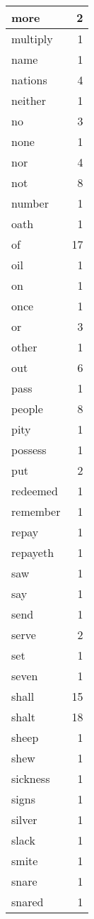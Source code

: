 \begin{center}
\begin{longtable}{l|r}
more & 2 \\ \hline
multiply & 1 \\ \hline
name & 1 \\ \hline
nations & 4 \\ \hline
neither & 1 \\ \hline
no & 3 \\ \hline
none & 1 \\ \hline
nor & 4 \\ \hline
not & 8 \\ \hline
number & 1 \\ \hline
oath & 1 \\ \hline
of & 17 \\ \hline
oil & 1 \\ \hline
on & 1 \\ \hline
once & 1 \\ \hline
or & 3 \\ \hline
other & 1 \\ \hline
out & 6 \\ \hline
pass & 1 \\ \hline
people & 8 \\ \hline
pity & 1 \\ \hline
possess & 1 \\ \hline
put & 2 \\ \hline
redeemed & 1 \\ \hline
remember & 1 \\ \hline
repay & 1 \\ \hline
repayeth & 1 \\ \hline
saw & 1 \\ \hline
say & 1 \\ \hline
send & 1 \\ \hline
serve & 2 \\ \hline
set & 1 \\ \hline
seven & 1 \\ \hline
shall & 15 \\ \hline
shalt & 18 \\ \hline
sheep & 1 \\ \hline
shew & 1 \\ \hline
sickness & 1 \\ \hline
signs & 1 \\ \hline
silver & 1 \\ \hline
slack & 1 \\ \hline
smite & 1 \\ \hline
snare & 1 \\ \hline
snared & 1 \\ \hline

\end{longtable}
\end{center}
